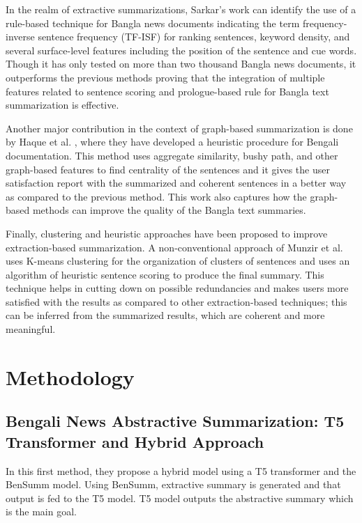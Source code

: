 \documentclass[12pt]{report}
\begin{document}
In the realm of extractive summarizations, Sarkar’s work \cite{ghosh2018rule} can identify the use of a rule-based technique for Bangla news documents indicating the term frequency-inverse sentence frequency (TF-ISF) for ranking sentences, keyword density, and several surface-level features including the position of the sentence and cue words. Though it has only tested on more than two thousand Bangla news documents, it outperforms the previous methods proving that the integration of multiple features related to sentence scoring and prologue-based rule for Bangla text summarization is effective.

Another major contribution in the context of graph-based summarization is done by Haque et al. \cite{andhale2016overview}, where they have developed a heuristic procedure for Bengali documentation. This method uses aggregate similarity, bushy path, and other graph-based features to find centrality of the sentences and it gives the user satisfaction report with the summarized and coherent sentences in a better way as compared to the previous method. This work also captures how the graph-based methods can improve the quality of the Bangla text summaries.

Finally, clustering and heuristic approaches have been proposed to improve extraction-based summarization. A non-conventional approach of Munzir et al. \cite{tumpa2018improved} uses K-means clustering for the organization of clusters of sentences and uses an algorithm of heuristic sentence scoring to produce the final summary. This technique helps in cutting down on possible redundancies and makes users more satisfied with the results as compared to other extraction-based techniques; this can be inferred from the summarized results, which are coherent and more meaningful.

\section*{Methodology}
\subsection*{Bengali News Abstractive Summarization: T5 Transformer and Hybrid Approach}
In this first method, they propose a hybrid model using a T5 transformer and the BenSumm model. Using BenSumm, extractive summary is generated and that output is fed to the T5 model. T5 model outputs the abstractive summary which is the main goal. 
\end{document}
